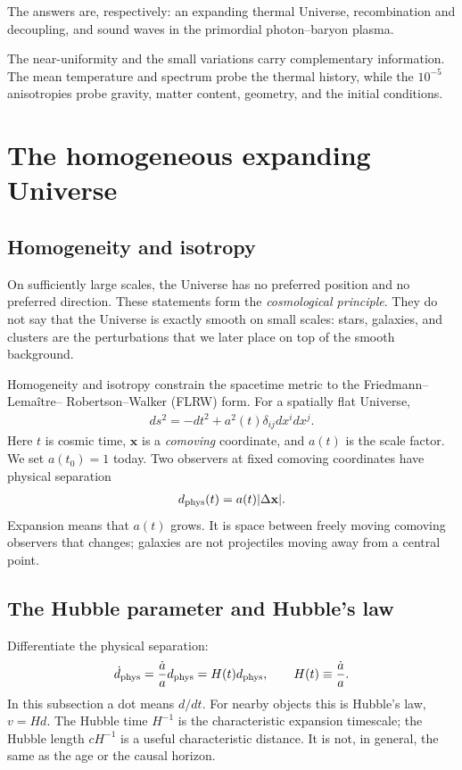 \documentclass[12pt]{article}
\newcommand{\be}{\begin{eqnarray}}
\newcommand{\ee}{\end{eqnarray}}
\newcommand{\bx}{\mathbf x}
\begin{document}
The answers are, respectively: an expanding thermal Universe, recombination and
decoupling, and sound waves in the primordial photon--baryon plasma.

The near-uniformity and the small variations carry complementary information. The
mean temperature and spectrum probe the thermal history, while the $10^{-5}$
anisotropies probe gravity, matter content, geometry, and the initial conditions.

\section{The homogeneous expanding Universe}

\subsection{Homogeneity and isotropy}
On sufficiently large scales, the Universe has no preferred position and no preferred
direction. These statements form the \emph{cosmological principle}. They do not say
that the Universe is exactly smooth on small scales: stars, galaxies, and clusters are
the perturbations that we later place on top of the smooth background.

Homogeneity and isotropy constrain the spacetime metric to the Friedmann--Lema\^{i}tre--
Robertson--Walker (FLRW) form. For a spatially flat Universe,
\be
\boxed{ds^2=-dt^2+a^2(t)\delta_{ij}dx^idx^j.}
\label{eq:FLRW}
\ee
Here $t$ is cosmic time, $\bx$ is a \emph{comoving} coordinate, and $a(t)$ is the
scale factor. We set $a(t_0)=1$ today. Two observers at fixed comoving coordinates
have physical separation
\be
d_{\rm phys}(t)=a(t)|\Delta\bx|.
\ee
Expansion means that $a(t)$ grows. It is space between freely moving comoving
observers that changes; galaxies are not projectiles moving away from a central point.

\subsection{The Hubble parameter and Hubble's law}
Differentiate the physical separation:
\be
\dot d_{\rm phys}=\frac{\dot a}{a}d_{\rm phys}=H(t)d_{\rm phys},
\qquad H(t)\equiv\frac{\dot a}{a}.
\ee
In this subsection a dot means $d/dt$. For nearby objects this is Hubble's law,
$v=Hd$. The Hubble time $H^{-1}$ is the characteristic expansion timescale; the
Hubble length $cH^{-1}$ is a useful characteristic distance. It is not, in general,
the same as the age or the causal horizon.
\end{document}
